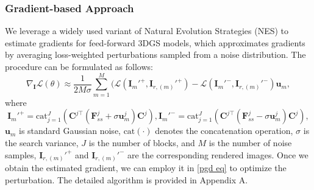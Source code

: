 \documentclass[runningheads]{llncs}
\begin{document}
\subsubsection{Gradient-based Approach}
We leverage a widely used variant of Natural Evolution Strategies (NES)\cite{ilyas2018black} to estimate gradients for feed-forward 3DGS models, which approximates gradients by averaging loss-weighted perturbations sampled from a noise distribution. The procedure can be formulated as follows:
\begin{equation}
\nabla_{\bm{I}}\mathcal{L}(\theta)
\approx
\frac{1}{2M\sigma}\sum_{m=1}^{M}
(\mathcal{L}(\bm{I}_m'^+,\bm{I}_{r,(m)}'^+)-\mathcal{L}(\bm{I}_m'^-,\bm{I}_{r,(m)}'^-)\mathbf{u}_m,
\end{equation}
where 
\begin{equation}
\label{back to img eq}
    \bm{I}_m'^+={\text{cat}}_{j=1}^J(\bm{C}^{j\top}(\bm{F}_{ss}^j+\sigma\bm{u}_m^j)\bm{C}^j), \bm{I}_m'^-={\text{cat}}_{j=1}^J(\bm{C}^{j\top}(\bm{F}_{ss}^j-\sigma\bm{u}_m^j)\bm{C}^j),
\end{equation}
$\bm{u}_m$ is standard Gaussian noise, $\text{cat}(\cdot)$ denotes the concatenation operation, $\sigma$ is the search variance, $J$ is the number of blocks, and $M$ is the number of noise samples, $\bm{I}_{r,(m)}'^+$ and $\bm{I}_{r,(m)}'^-$ are the corresponding rendered images. Once we obtain the estimated gradient, we can employ it in \cref{pgd eq} to optimize the perturbation. The detailed algorithm is provided in Appendix A.
\end{document}

